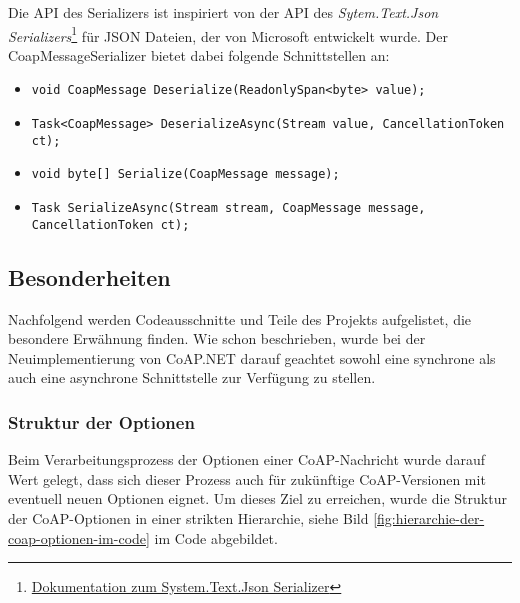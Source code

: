 Die API des Serializers ist inspiriert von der API des \textit{Sytem.Text.Json Serializers}\footnote{\href{https://docs.microsoft.com/en-us/dotnet/api/system.text.json.jsonserializer?view=net-6.0}{Dokumentation zum System.Text.Json Serializer}} für JSON Dateien, der von Microsoft entwickelt wurde. Der CoapMessageSerializer bietet dabei folgende Schnittstellen an:
\begin{itemize}
    \item \texttt{void CoapMessage Deserialize(ReadonlySpan<byte> value);}
    \item \texttt{Task<CoapMessage> DeserializeAsync(Stream value, CancellationToken ct);}
    \item \texttt{void byte[] Serialize(CoapMessage message);}
    \item \texttt{Task SerializeAsync(Stream stream, CoapMessage message, CancellationToken ct);}
\end{itemize}

\subsection{Besonderheiten}
\label{subsec:besonderheiten}

Nachfolgend werden Codeausschnitte und Teile des Projekts aufgelistet, die besondere Erwähnung finden. Wie schon beschrieben, wurde bei der Neuimplementierung von CoAP.NET darauf geachtet sowohl eine synchrone als auch eine asynchrone Schnittstelle zur Verfügung zu stellen.

\subsubsection{Struktur der Optionen}
\label{subsubsec:struktur-der-optionen}

Beim Verarbeitungsprozess der Optionen einer CoAP-Nachricht wurde darauf Wert gelegt, dass sich dieser Prozess auch für zukünftige CoAP-Versionen mit eventuell neuen Optionen eignet. Um dieses Ziel zu erreichen, wurde die Struktur der CoAP-Optionen in einer strikten Hierarchie, siehe Bild \ref{fig:hierarchie-der-coap-optionen-im-code} im Code abgebildet.

